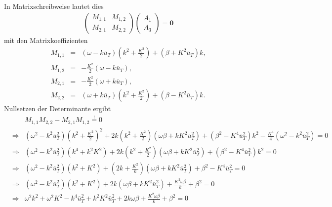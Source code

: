 \documentclass{book}
\newcommand{\hastobe}{\stackrel{!}{=}}
\newcommand\newoverline[1]{%
\overline{#1}}
\begin{document}
%
In Matrixschreibweise lautet dies
%
\begin{eqnarray}
\left(\begin{array}{cc}
M_{1, 1}&M_{1, 2}\\
M_{2, 1}&M_{2, 2}
\end{array}\right)\left(\begin{array}{c}
A_1\\
A_3
\end{array}\right) = \mathbf{0}
\end{eqnarray}
%
mit den Matrixkoeffizienten
%
\begin{eqnarray}
M_{1, 1} & = & \left(\omega - k\newoverline{u}_T\right)\left(k^2 + \frac{K^2}{2}\right) + \left(\beta + K^2\newoverline{u}_T\right)k,\\
M_{1, 2} & = & -\frac{K^2}{2}\left(\omega - k\newoverline{u}_T\right),\\
M_{2, 1} & = & -\frac{K^2}{2}\left(\omega + k\newoverline{u}_T\right),\\
M_{2, 2} & = & \left(\omega + k\newoverline{u}_T\right)\left(k^2 + \frac{K^2}{2}\right) + \left(\beta - K^2\newoverline{u}_T\right)k.
\end{eqnarray}
%
Nullsetzen der Determinante ergibt
%
\begin{eqnarray}
&&M_{1, 1}M_{2, 2} - M_{2, 1}M_{1, 2}\hastobe0\nonumber\\
&\Rightarrow&\left(\omega^2 - k^2\newoverline{u}_T^2\right)\left(k^2 + \frac{K^2}{2}\right)^2 + 2k\left(k^2 + \frac{K^2}{2}\right)\left(\omega\beta + kK^2\newoverline{u}_T^2\right) + \left(\beta^2 - K^4\newoverline{u}_T^2\right)k^2 - \frac{K^4}{4}\left(\omega^2 - k^2\newoverline{u}_T^2\right) = 0\nonumber\\
&\Rightarrow&\left(\omega^2 - k^2\newoverline{u}_T^2\right)\left(k^4 + k^2K^2\right) + 2k\left(k^2 + \frac{K^2}{2}\right)\left(\omega\beta + kK^2\newoverline{u}_T^2\right) + \left(\beta^2 - K^4\newoverline{u}_T^2\right)k^2 = 0\nonumber\\
&\Rightarrow&\left(\omega^2 - k^2\newoverline{u}_T^2\right)\left(k^2 + K^2\right) + \left(2k + \frac{K^2}{k}\right)\left(\omega\beta + kK^2\newoverline{u}_T^2\right) + \beta^2 - K^4\newoverline{u}_T^2 = 0\nonumber\\
&\Rightarrow&\left(\omega^2 - k^2\newoverline{u}_T^2\right)\left(k^2 + K^2\right) + 2k\left(\omega\beta + kK^2\newoverline{u}_T^2\right) + \frac{K^2\omega\beta}{k} + \beta^2 = 0\nonumber\\
&\Rightarrow&\omega^2k^2 + \omega^2K^2 - k^4\newoverline{u}_T^2 + k^2K^2\newoverline{u}_T^2 + 2k\omega\beta + \frac{K^2\omega\beta}{k} + \beta^2 = 0\nonumber
\end{eqnarray}
\end{document}
